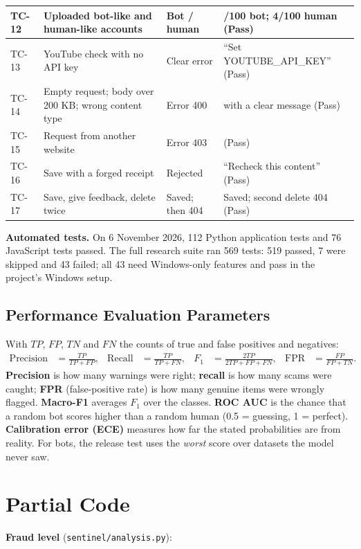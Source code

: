 \begin{footnotesize}
\begin{longtable}{|l|>{\raggedright\arraybackslash}p{5.0cm}|>{\raggedright\arraybackslash}p{3.6cm}|>{\raggedright\arraybackslash}p{4.4cm}|}
TC-12 & Uploaded bot-like and human-like accounts & Bot / human & 82/100 bot; 4/100 human (Pass) \\ \hline
TC-13 & YouTube check with no API key & Clear error & ``Set YOUTUBE\_API\_KEY'' (Pass) \\ \hline
TC-14 & Empty request; body over 200 KB; wrong content type & Error 400 & 400 with a clear message (Pass) \\ \hline
TC-15 & Request from another website & Error 403 & 403 (Pass) \\ \hline
TC-16 & Save with a forged receipt & Rejected & ``Recheck this content'' (Pass) \\ \hline
TC-17 & Save, give feedback, delete twice & Saved; then 404 & Saved; second delete 404 (Pass) \\ \hline
\end{longtable}
\end{footnotesize}

\noindent\textbf{Automated tests.} On 6 November 2026, 112 Python application tests and 76 JavaScript tests passed. The full research suite ran 569 tests: 519 passed, 7 were skipped and 43 failed; all 43 need Windows-only features and pass in the project's Windows setup.

\subsection{Performance Evaluation Parameters}
\noindent With $TP$, $FP$, $TN$ and $FN$ the counts of true and false positives and negatives:
\begin{align}
\text{Precision} &= \frac{TP}{TP+FP}, &
\text{Recall} &= \frac{TP}{TP+FN}, &
F_1 &= \frac{2TP}{2TP+FP+FN}, &
\text{FPR} &= \frac{FP}{FP+TN}.
\end{align}
\textbf{Precision} is how many warnings were right; \textbf{recall} is how many scams were caught; \textbf{FPR} (false-positive rate) is how many genuine items were wrongly flagged. \textbf{Macro-F1} averages $F_1$ over the classes. \textbf{ROC AUC} is the chance that a random bot scores higher than a random human (0.5 = guessing, 1 = perfect). \textbf{Calibration error (ECE)} measures how far the stated probabilities are from reality. For bots, the release test uses the \emph{worst} score over datasets the model never saw.

\section{Partial Code}
\noindent\textbf{Fraud level} (\texttt{sentinel/analysis.py}):

